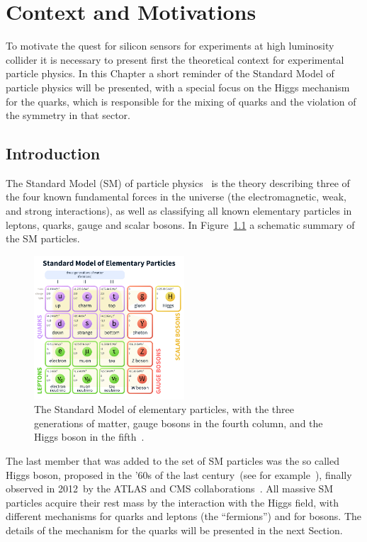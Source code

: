 \chapter{Context and Motivations}
\label{chap:context}
To motivate the quest for silicon sensors for experiments at high luminosity collider it is necessary 
to present first the theoretical context for experimental particle physics. In this Chapter a short 
reminder of the Standard Model of particle physics will be presented, with a special focus on 
the Higgs mechanism for the quarks, which is responsible for the mixing of quarks and the 
violation of the \CP symmetry in that sector.

\section{Introduction}
\label{sec:intro}

The Standard Model (SM) of particle physics~\cite{GLASHOW1961579,PhysRevLett.19.1264,SalamSM,PhysRevLett.30.1343,PhysRevLett.30.1346} is the theory describing three of the four known fundamental forces in the universe (the electromagnetic, weak, and strong interactions), as well as classifying all known elementary particles in leptons, quarks, gauge and scalar bosons. In Figure~\ref{fig:SM} a schematic summary of the SM 
particles.


\begin{figure}[htbp]
   \centering
   \includegraphics[width=0.5\textwidth]{SM.png} %
   \caption{The Standard Model of elementary particles, with the three generations of matter, gauge bosons in the fourth column, and the Higgs boson in the fifth~\cite{wiki:xxx}.}
   \label{fig:SM}
\end{figure}

The last member that was added to the set of SM particles was the so called Higgs boson, proposed in the '60s of the last century~(see for example~\cite{HIGGS1964132,PhysRevLett.13.321}),  finally observed in 2012~by the ATLAS and CMS collaborations~\cite{20121,201230}.
All massive SM particles acquire their rest mass by the interaction with the Higgs field, with different 
mechanisms for quarks and leptons (the ``fermions'') and for bosons. The details of the mechanism for 
the quarks will be presented in the next Section.

